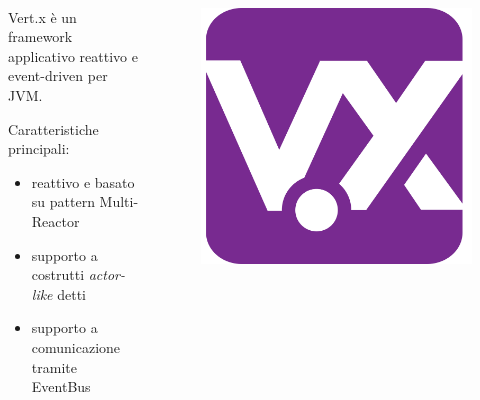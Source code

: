     \begin{frame}{\insertsectionhead}
      \framesubtitle{\insertsubsectionhead}

      \begin{columns}
        \begin{column}{.8\textwidth}
          \begin{block}{Vert.x}
             è un framework applicativo reattivo e event-driven per JVM.

            Caratteristiche principali:
            \begin{itemize}
              \item<2-> reattivo e basato su pattern Multi-Reactor
              \item<3-> supporto a costrutti \emph{actor-like} detti 
              \item<4-> supporto a comunicazione tramite EventBus
            \end{itemize}

          \end{block}
        \end{column}
        \begin{column}{.15\textwidth}
          \begin{figure}
            \includegraphics[width=\textwidth]{res/uml/vertx-logo-big.png}
          \end{figure}
        \end{column}
      \end{columns}


\end{frame}
